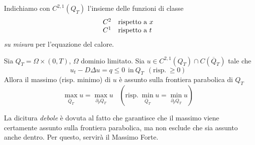 Indichiamo con $C^{2,1}(Q_{T})$ l'insieme delle funzioni di classe
\begin{equation*}
    \begin{array}{ l l }
        C^{2} & \text{rispetto a} \ x \\
        C^{1} & \text{rispetto a} \ t
    \end{array}
\end{equation*}
\textit{su misura} per l'equazione del calore.
\begin{theorem}
     Sia $Q_{T} =\Omega \times (0,T)$, $\Omega $ dominio limitato. Sia $u\in C^{2,1}(Q_{T}) \cap C(\overline{Q}_{T})$ tale che
    \begin{equation*}
        u_{t} -D\Delta u=q\leq 0\ \ \text{in} \ Q_{T} \ \ \left(\text{risp.} \ \geq 0\right)
    \end{equation*}
    Allora il massimo (risp. minimo) di $u$ è assunto sulla frontiera parabolica di $Q_{T}$
    \begin{equation*}
        \max_{\overline{Q}_{T}} u=\max_{\partial _{p} Q_{T}} u\ \ \ \ \left(\text{risp.} \ \min_{\overline{Q}_{T}} u=\min_{\partial _{p} Q_{T}} u\right)
    \end{equation*}
\end{theorem}
La dicitura \emph{debole} è dovuta al fatto che garantisce che il massimo viene certamente assunto sulla frontiera parabolica, ma non esclude che sia assunto anche dentro. Per questo, servirà il Massimo Forte.

